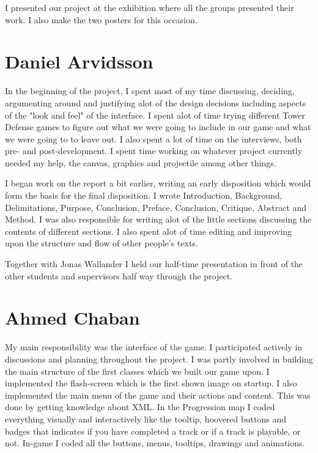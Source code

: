 I presented our project at the exhibition where all the groups presented their work. I also make the two posters for this occasion.


\section{Daniel Arvidsson}

In the beginning of the project, I spent most of my time discussing, deciding, argumenting around and justifying alot of the design decisions including aspects of the "look and feel" of the interface. I spent alot of time trying different Tower Defense games to figure out what we were going to include in our game and what we were going to to leave out. I also spent a lot of time on the interviews, both pre- and post-development. 
I spent time working on whatever project currently needed my help, the canvas, graphics and projectile among other things. 

I began work on the report a bit earlier, writing an early disposition which would form the basis for the final disposition. I wrote Introduction, Background, Delimitations, Purpose, Conclusion, Preface, Conclusion, Critique, Abstract and Method. I was also responsible for writing alot of the little sections discussing the contents of different sections. I also spent alot of time editing and improving upon the structure and flow of other people's texts.

Together with Jonas Wallander I held our half-time presentation in front of the other students and supervisors half way through the project. 


\section{Ahmed Chaban}

My main responsibility was the interface of the game. I participated actively in discussions and planning throughout the project. I was partly involved in building the main structure of the first classes which we built our game upon. I implemented the flash-screen which is the first shown image on startup. I also implemented the main menu of the game and their actions and content. This was done by getting knowledge about XML. In the Progression map I coded everything visually and interactively like the tooltip, hoovered buttons and badges that indicates if you have completed a track or if a track is playable, or not. In-game I coded all the buttons, menus, tooltips, drawings and animations.

